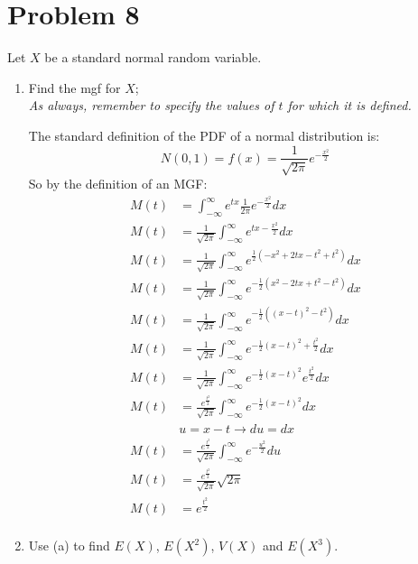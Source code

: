 \documentclass{article}
\newcommand{\1}{\mathbf{1}}
\begin{document}
\newpage
\section*{Problem 8}
Let $X$ be a standard normal random variable.
\begin{enumerate}
    \item Find the mgf for $X$;\\
    {\it As always, remember to specify the values of $t$ for which it is defined.}
    
    The standard definition of the PDF of a normal distribution is:
    $$ N(0,1) = f(x) = \frac{1}{\sqrt{2\pi}} e^{-\frac{x^2}{2}} $$
    So by the definition of an MGF:
    \begin{align*}
        M(t) &= \int_{-\infty}^\infty e^{tx} \frac{1}{2\pi} e^{-\frac{x^2}{2}} dx \\
        M(t) &=  \frac{1}{\sqrt{2\pi}} \int_{-\infty}^\infty e^{tx-\frac{x^2}{2}} dx \\
        M(t) &=  \frac{1}{\sqrt{2\pi}} \int_{-\infty}^\infty e^{\frac{1}{2}(-x^2 + 2tx - t^2 + t^2)} dx \\
        M(t) &=  \frac{1}{\sqrt{2\pi}} \int_{-\infty}^\infty e^{-\frac{1}{2}(x^2 - 2tx + t^2 - t^2)} dx \\
        M(t) &=  \frac{1}{\sqrt{2\pi}} \int_{-\infty}^\infty e^{-\frac{1}{2}((x-t)^2 - t^2)} dx \\
        M(t) &=  \frac{1}{\sqrt{2\pi}} \int_{-\infty}^\infty e^{-\frac{1}{2}(x-t)^2 + \frac{t^2}{2}} dx \\
        M(t) &=  \frac{1}{\sqrt{2\pi}} \int_{-\infty}^\infty e^{-\frac{1}{2}(x-t)^2} e^{\frac{t^2}{2}} dx \\
        M(t) &=  \frac{e^{\frac{t^2}{2}}}{\sqrt{2\pi}} \int_{-\infty}^\infty e^{-\frac{1}{2}(x-t)^2} dx \\
        & u = x - t \rightarrow du = dx \\
        M(t) &=  \frac{e^{\frac{t^2}{2}}}{\sqrt{2\pi}} \int_{-\infty}^\infty e^{-\frac{u^2}{2}} du \\
        M(t) &=  \frac{e^{\frac{t^2}{2}}}{\sqrt{2\pi}} \sqrt{2\pi} \\
        M(t) &=  e^{\frac{t^2}{2}} \\
    \end{align*}

    \newpage
    \item Use (a) to find $E(X)$, $E(X^2)$, $V(X)$ and $E(X^3)$.
    

\end{enumerate}
\end{document}
